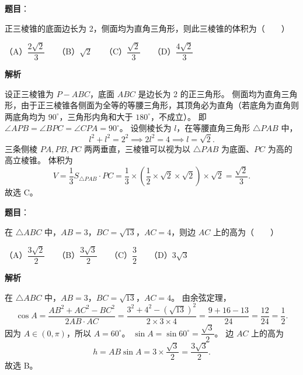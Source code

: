 \begin{answer}

\textbf{题目}：

正三棱锥的底面边长为 2，侧面均为直角三角形，则此三棱锥的体积为\mbox{（　　）}

（A）$\dfrac{2\sqrt{2}}{3}$　　（B）$\sqrt{2}$　　（C）$\dfrac{\sqrt{2}}{3}$　　（D）$\dfrac{4\sqrt{2}}{3}$

\textbf{解析}

设正三棱锥为 $P-ABC$，底面 $ABC$ 是边长为 2 的正三角形。
侧面均为直角三角形，由于正三棱锥各侧面为全等的等腰三角形，其顶角必为直角（若底角为直角则两底角均为 $90^\circ$，三角形内角和大于 $180^\circ$，不成立）。
即 $\angle APB=\angle BPC=\angle CPA=90^\circ$。
设侧棱长为 $l$，在等腰直角三角形 $\triangle PAB$ 中，
\nopagebreak[4]
\[
l^2+l^2=2^2 \implies 2l^2=4 \implies l=\sqrt{2}.
\]
三条侧棱 $PA,PB,PC$ 两两垂直，三棱锥可以视为以 $\triangle PAB$ 为底面、$PC$ 为高的高立棱锥。
体积为
\nopagebreak[4]
\[
V=\frac{1}{3}S_{\triangle PAB}\cdot PC=\frac{1}{3}\times\left(\frac{1}{2}\times\sqrt{2}\times\sqrt{2}\right)\times\sqrt{2}=\frac{\sqrt{2}}{3}.
\]
故选 C。


\end{answer}
\begin{answer}

\textbf{题目}：

在 $\triangle ABC$ 中，$AB=3$，$BC=\sqrt{13}$，$AC=4$，则边 $AC$ 上的高为\mbox{（　　）}

（A）$\dfrac{3\sqrt{2}}{2}$　　（B）$\dfrac{3\sqrt{3}}{2}$　　（C）$\dfrac{3}{2}$　　（D）$3\sqrt{3}$

\textbf{解析}

在 $\triangle ABC$ 中，$AB=3$，$BC=\sqrt{13}$，$AC=4$。
由余弦定理，
\nopagebreak[4]
\[
\cos A=\frac{AB^2+AC^2-BC^2}{2AB\cdot AC}=\frac{3^2+4^2-(\sqrt{13})^2}{2\times 3\times 4}=\frac{9+16-13}{24}=\frac{12}{24}=\frac{1}{2}.
\]
因为 $A\in(0,\pi)$，所以 $A=60^\circ$。
$\sin A=\sin 60^\circ=\dfrac{\sqrt{3}}{2}$。
边 $AC$ 上的高为
\nopagebreak[4]
\[
h=AB\sin A=3\times\frac{\sqrt{3}}{2}=\frac{3\sqrt{3}}{2}.
\]
故选 B。


\end{answer}
